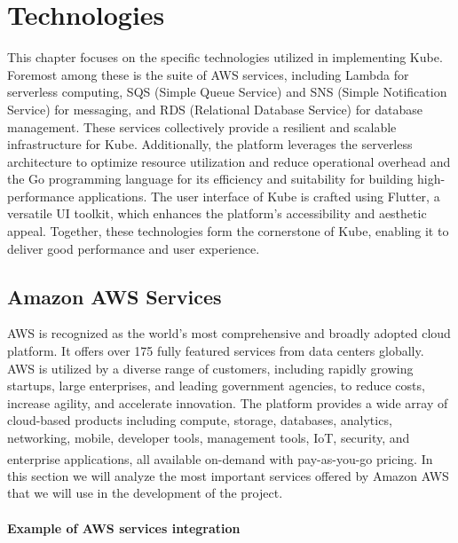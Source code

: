 \chapter{Technologies}
This chapter focuses on the specific technologies utilized in implementing Kube. Foremost among
these is the suite of AWS services, including Lambda for serverless computing, SQS (Simple Queue
Service) and SNS (Simple Notification Service) for messaging, and RDS (Relational Database Service)
for database management. These services collectively provide a resilient and scalable infrastructure
for Kube. Additionally, the platform leverages the serverless architecture to optimize resource
utilization and reduce operational overhead and the Go programming language for its efficiency and
suitability for building high-performance applications. The user interface of Kube is crafted using
Flutter, a versatile UI toolkit, which enhances the platform's accessibility and aesthetic appeal.
Together, these technologies form the cornerstone of Kube, enabling it to deliver good performance
and user experience.

\section{Amazon AWS Services}
AWS is recognized as the world's most comprehensive and broadly adopted cloud platform. It offers
over 175 fully featured services from data centers globally. AWS is utilized by a diverse range of
customers, including rapidly growing startups, large enterprises, and leading government agencies,
to reduce costs, increase agility, and accelerate innovation. The platform provides a wide array of
cloud-based products including compute, storage, databases, analytics, networking, mobile, developer
tools, management tools, IoT, security, and enterprise applications, all available on-demand with
pay-as-you-go pricing\textsuperscript{\cite{tech_1}}. In this section we will analyze the most
important services offered by Amazon AWS that we will use in the development of the project.

\newpage

\subsubsection{Example of AWS services integration}

